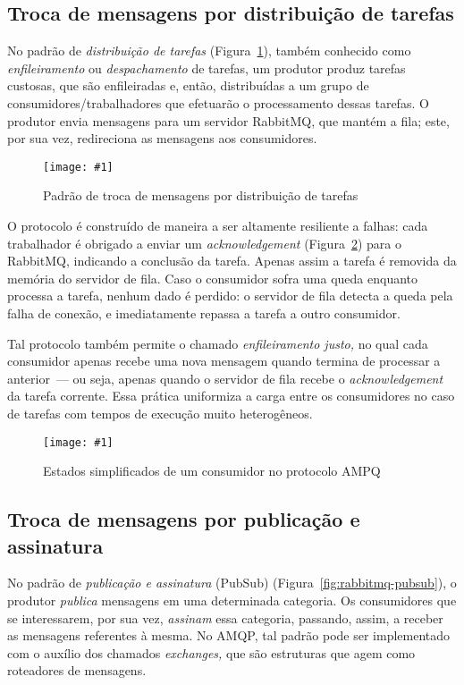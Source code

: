 \documentclass[ruledheader, 12pt]{abnt}
\newcommand{\figcustom}[4]{\par
	\begin{figure}[#3]
		\centering
		\texttt{[image: \#1]}
		\caption{\label{fig:#1}#2}
	\end{figure}
\par}
\newcommand{\figref}[1]{(Figura~\ref{fig:#1})}
\begin{document}
\subsection{Troca de mensagens por distribuição de tarefas}

No padrão de \emph{distribuição de tarefas} \figref{rabbitmq-workqueue}, também conhecido como \emph{enfileiramento} ou \emph{despachamento} de tarefas, um produtor produz tarefas custosas, que são enfileiradas e, então, distribuídas a um grupo de consumidores/trabalhadores que efetuarão o processamento dessas tarefas. O produtor envia mensagens para um servidor RabbitMQ, que mantém a fila; este, por sua vez, redireciona as mensagens aos consumidores.

\figcustom{rabbitmq-workqueue}{Padrão de troca de mensagens por distribuição de tarefas}{tp}{1}

O protocolo é construído de maneira a ser altamente resiliente a falhas: cada trabalhador é obrigado a enviar um \emph{acknowledgement} \figref{rabbitmq-worker} para o RabbitMQ, indicando a conclusão da tarefa. Apenas assim a tarefa é removida da memória do servidor de fila. Caso o consumidor sofra uma queda enquanto processa a tarefa, nenhum dado é perdido: o servidor de fila detecta a queda pela falha de conexão, e imediatamente repassa a tarefa a outro consumidor.

Tal protocolo também permite o chamado \emph{enfileiramento justo,} no qual cada consumidor apenas recebe uma nova mensagem quando termina de processar a anterior~--- ou seja, apenas quando o servidor de fila recebe o \emph{acknowledgement} da tarefa corrente. Essa prática uniformiza a carga entre os consumidores no caso de tarefas com tempos de execução muito heterogêneos.

\figcustom{rabbitmq-worker}{Estados simplificados de um consumidor no protocolo AMPQ}{tp}{0.6}

\subsection{Troca de mensagens por publicação e assinatura}


No padrão de \emph{publicação e assinatura} (PubSub) \figref{rabbitmq-pubsub}, o produtor \emph{publica} mensagens em uma determinada categoria. Os consumidores que se interessarem, por sua vez, \emph{assinam} essa categoria, passando, assim, a receber as mensagens referentes à mesma. No AMQP, tal padrão pode ser implementado com o auxílio dos chamados \emph{exchanges,}  que são estruturas que agem como roteadores de mensagens.
\end{document}

